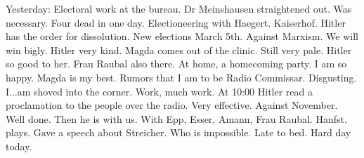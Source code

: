 Yesterday: Electoral work at the bureau. Dr Meinshausen straightened out. Was necessary. Four dead in one day. Electioneering with Haegert. Kaiserhof. Hitler has the order for dissolution. New elections March 5th.  Against Marxism. We will win bigly. Hitler very kind. Magda comes out of the clinic. Still very pale. Hitler so good to her. Frau Raubal also there. At home, a homecoming party. I am so happy. Magda is my best. Rumors that I am to be Radio Commissar. Disgusting. I...am shoved into the corner. Work, much work. At 10:00 Hitler read a proclamation to the people over the radio. Very effective. Against November. Well done. Then he is with us. With Epp, Esser, Amann, Frau Raubal. Hanfst. plays. Gave a speech about Streicher. Who is impossible. Late to bed. Hard day today.

